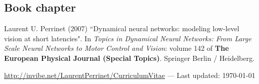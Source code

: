 \documentclass[11pt, a4paper]{article}
\newcommand{\Website}{http://invibe.net/LaurentPerrinet}
\newcommand{\doi}[1]{\href{#1}{\scriptsize\textsc{[doi]}}}
\newcommand{\years}[1]{\marginnote{\scriptsize #1}}
\providecommand{\doi}[1]{doi: #1}\else
\providecommand{\doi}{doi: \begingroup \urlstyle{rm}\Url}\fi
\begin{document}
\subsection*{Book chapter}

\noindent\years{2007}Laurent U. Perrinet (2007) “Dynamical neural networks: modeling low-level vision at short latencies".  In \emph{Topics in Dynamical Neural Networks: From Large Scale Neural Networks to Motor Control and Vision}: volume 142 of {\bf The European Physical Journal (Special Topics)}.  Springer Berlin / Heidelberg.%


%
%

\vfill{}
\hrulefill

\begin{center}

{\footnotesize \href{\Website/CurriculumVitae}{\Website/CurriculumVitae} — Last updated: \today
}
\end{center}
\end{document}

